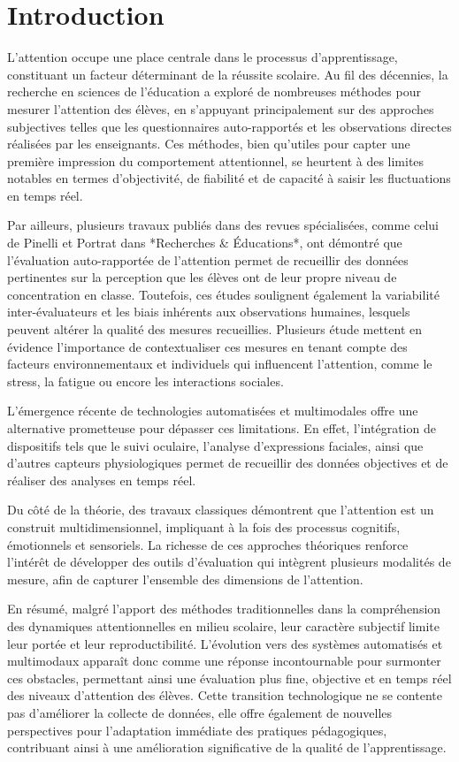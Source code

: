 \section{Introduction}

L’attention occupe une place centrale dans le processus d’apprentissage, constituant un facteur déterminant de la réussite scolaire. Au fil des décennies, la recherche en sciences de l’éducation a exploré de nombreuses méthodes pour mesurer l’attention des élèves, en s’appuyant principalement sur des approches subjectives telles que les questionnaires auto-rapportés et les observations directes réalisées par les enseignants. Ces méthodes, bien qu'utiles pour capter une première impression du comportement attentionnel, se heurtent à des limites notables en termes d'objectivité, de fiabilité et de capacité à saisir les fluctuations en temps réel.

Par ailleurs, plusieurs travaux publiés dans des revues spécialisées, comme celui de Pinelli et Portrat dans *Recherches \& Éducations*, ont démontré que l’évaluation auto-rapportée de l’attention permet de recueillir des données pertinentes sur la perception que les élèves ont de leur propre niveau de concentration en classe. Toutefois, ces études soulignent également la variabilité inter-évaluateurs et les biais inhérents aux observations humaines, lesquels peuvent altérer la qualité des mesures recueillies. Plusieurs étude mettent en évidence l’importance de contextualiser ces mesures en tenant compte des facteurs environnementaux et individuels qui influencent l’attention, comme le stress, la fatigue ou encore les interactions sociales.

L’émergence récente de technologies automatisées et multimodales offre une alternative prometteuse pour dépasser ces limitations. En effet, l’intégration de dispositifs tels que le suivi oculaire, l’analyse d’expressions faciales, ainsi que d’autres capteurs physiologiques permet de recueillir des données objectives et de réaliser des analyses en temps réel. 

Du côté de la théorie, des travaux classiques démontrent que l’attention est un construit multidimensionnel, impliquant à la fois des processus cognitifs, émotionnels et sensoriels. La richesse de ces approches théoriques renforce l’intérêt de développer des outils d’évaluation qui intègrent plusieurs modalités de mesure, afin de capturer l’ensemble des dimensions de l’attention.

En résumé, malgré l’apport des méthodes traditionnelles dans la compréhension des dynamiques attentionnelles en milieu scolaire, leur caractère subjectif limite leur portée et leur reproductibilité. L’évolution vers des systèmes automatisés et multimodaux apparaît donc comme une réponse incontournable pour surmonter ces obstacles, permettant ainsi une évaluation plus fine, objective et en temps réel des niveaux d’attention des élèves. Cette transition technologique ne se contente pas d’améliorer la collecte de données, elle offre également de nouvelles perspectives pour l’adaptation immédiate des pratiques pédagogiques, contribuant ainsi à une amélioration significative de la qualité de l’apprentissage.

